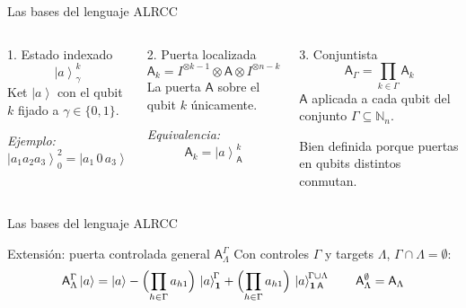 \documentclass[12pt, aspectratio=169]{beamer}
\newcommand{\qg}[1]{\mathsf{#1}}
\newcommand{\stateket}[3]{\left|#1\right\rangle^{\!#2}_{#3}}
\newcommand{\stategate}[3]{\qg{#1}^{#2}_{#3}}
\newcommand{\ket}[1]{\left|#1\right\rangle}
\begin{document}
\begin{frame}{Las bases del lenguaje ALRCC}
  \begin{columns}[T]
    \begin{block}{1. Estado indexado}
      \centering
      \[
        \stateket{a}{k}{\gamma}
      \]
      \small
      Ket $\ket{a}$ con el qubit $k$ fijado a $\gamma \in \{0,1\}$.

      \smallskip
      \textit{Ejemplo:}
      \[
        \stateket{a_1 a_2 a_3}{2}{0} = \ket{a_1\,0\,a_3}
      \]
    \end{block}

    \begin{block}{2. Puerta localizada}
      \centering
      \[
        \qg{A}_k = I^{\otimes k-1} \otimes \qg{A} \otimes I^{\otimes n-k}
      \]
      \small
      La puerta $\qg{A}$ sobre el qubit $k$ únicamente.

      \smallskip
      \textit{Equivalencia:}
      \[
        \qg{A}_k = \stateket{a}{k}{\qg{A}}
      \]
    \end{block}

    \begin{block}{3. Conjuntista}
      \centering
      \[
        \qg{A}_\Gamma = \prod_{k \in \Gamma} \qg{A}_k
      \]
      \small
      $\qg{A}$ aplicada a cada qubit del conjunto $\Gamma \subseteq \mathbb{N}_n$.

      \smallskip
      Bien definida porque puertas en qubits distintos conmutan.
    \end{block}
  \end{columns}
\end{frame}

\begin{frame}{Las bases del lenguaje ALRCC}
  \begin{block}{Extensión: puerta controlada general $\stategate{A}{\Gamma}{\Lambda}$}
    \small
    Con controles $\Gamma$ y targets $\Lambda$, $\Gamma \cap \Lambda = \emptyset$:
    \[
      \stategate{A}{\Gamma}{\Lambda}\ket{a}
      = \ket{a}
      - \Bigl(\prod_{h \in \Gamma} a_{h1}\Bigr)\,\stateket{a}{\Gamma}{\mathbf{1}}
      + \Bigl(\prod_{h \in \Gamma} a_{h1}\Bigr)\,\stateket{a}{\Gamma \cup \Lambda}{\mathbf{1}\,\qg{A}}
      \quad\quad \stategate{A}{\emptyset}{\Lambda} = \qg{A}_\Lambda
    \]
  \end{block}
\end{frame}

\end{document}
